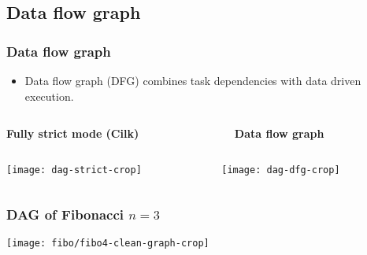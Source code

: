\subsection{Data flow graph}
\begin{frame}
  \frametitle{Data flow graph}
  \begin{itemize}
  \item Data flow graph (DFG) combines task dependencies with data driven execution.
  \end{itemize}
  \vspace{-4mm}
  \begin{columns}
    \begin{column}{0.5\textwidth}
      \begin{center}
	{\bf Fully strict mode (Cilk)}
      \end{center}
    \end{column}
    \begin{column}{0.5\textwidth}
      \begin{center}
	{\bf Data flow graph}
      \end{center}
    \end{column}
  \end{columns}
  \vspace{-2mm}
  \begin{columns}
    \begin{column}{0.5\textwidth}
      \begin{center}
	\texttt{[image: dag-strict-crop]}
      \end{center}
    \end{column}
    \begin{column}{0.5\textwidth}
      \begin{center}
	\texttt{[image: dag-dfg-crop]}
      \end{center}
    \end{column}
  \end{columns}
\end{frame}
\begin{frame}
  \frametitle{DAG of Fibonacci $n = 3$}
  \vspace{-10mm}
  \begin{center}
    \texttt{[image: fibo/fibo4-clean-graph-crop]}
  \end{center}
\end{frame}
